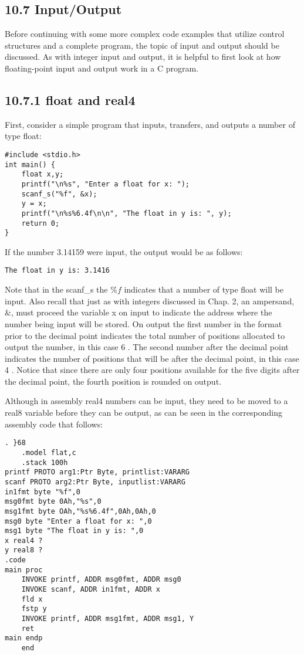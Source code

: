 \documentclass[10pt]{article}
\begin{document}
\subsection*{10.7 Input/Output}
Before continuing with some more complex code examples that utilize control structures and a complete program, the topic of input and output should be discussed. As with integer input and output, it is helpful to first look at how floating-point input and output work in a C program.

\subsection*{10.7.1 float and real4}
First, consider a simple program that inputs, transfers, and outputs a number of type float:

\begin{verbatim}
#include <stdio.h>
int main() {
    float x,y;
    printf("\n%s", "Enter a float for x: ");
    scanf_s("%f", &x);
    y = x;
    printf("\n%s%6.4f\n\n", "The float in y is: ", y);
    return 0;
}
\end{verbatim}

If the number 3.14159 were input, the output would be as follows:

\begin{verbatim}
The float in y is: 3.1416
\end{verbatim}

Note that in the scanf\_s the $\% f$ indicates that a number of type float will be input. Also recall that just as with integers discussed in Chap. 2, an ampersand, $\&$, must proceed the variable x on input to indicate the address where the number being input will be stored. On output the first number in the format prior to the decimal point indicates the total number of positions allocated to output the number, in this case 6 . The second number after the decimal point indicates the number of positions that will be after the decimal point, in this case 4 . Notice that since there are only four positions available for the five digits after the decimal point, the fourth position is rounded on output.

Although in assembly real4 numbers can be input, they need to be moved to a real8 variable before they can be output, as can be seen in the corresponding assembly code that follows:

\begin{verbatim}
. }68
    .model flat,c
    .stack 100h
printf PROTO arg1:Ptr Byte, printlist:VARARG
scanf PROTO arg2:Ptr Byte, inputlist:VARARG
in1fmt byte "%f",0
msg0fmt byte 0Ah,"%s",0
msg1fmt byte OAh,"%s%6.4f",0Ah,0Ah,0
msg0 byte "Enter a float for x: ",0
msg1 byte "The float in y is: ",0
x real4 ?
y real8 ?
.code
main proc
    INVOKE printf, ADDR msg0fmt, ADDR msg0
    INVOKE scanf, ADDR in1fmt, ADDR x
    fld x
    fstp y
    INVOKE printf, ADDR msg1fmt, ADDR msg1, Y
    ret
main endp
    end
\end{verbatim}
\end{document}
